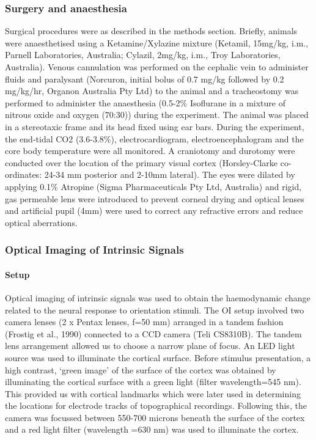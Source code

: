 		\subsubsection{Surgery and anaesthesia}
		Surgical procedures were as described in the methods section. Briefly, animals were anaesthetised using a Ketamine/Xylazine mixture (Ketamil, 15mg/kg, i.m., Parnell Laboratories, Australia; Cylazil, 2mg/kg, i.m., Troy Laboratories, Australia). Venous cannulation was performed on the cephalic vein to administer fluids and paralysant (Norcuron, initial bolus of 0.7 mg/kg followed by 0.2 mg/kg/hr, Organon Australia Pty Ltd) to the animal and a tracheostomy was performed to administer the anaesthesia (0.5-2\% Isoflurane in a mixture of nitrous oxide and oxygen (70:30)) during the experiment. The animal was placed in a stereotaxic frame and its head fixed using ear bars. During the experiment, the end-tidal CO2 (3.6-3.8\%), electrocardiogram, electroencephalogram and the core body temperature were all monitored. A craniotomy and durotomy were conducted over the location of the primary visual cortex (Horsley-Clarke co-ordinates: 24-34 mm posterior and 2-10mm lateral). The eyes were dilated by applying 0.1\% Atropine (Sigma Pharmaceuticals Pty Ltd, Australia) and rigid, gas permeable lens were introduced to prevent corneal drying and optical lenses and artificial pupil (4mm) were used to correct any refractive errors and reduce optical aberrations.
	
		\subsubsection{Optical Imaging of Intrinsic Signals}
		
		\paragraph{Setup}
		Optical imaging of intrinsic signals was used to obtain the haemodynamic change related to the neural response to orientation stimuli. The OI setup involved two camera lenses (2 x Pentax lenses, f=50 mm) arranged in a tandem fashion (Frostig et al., 1990) connected to a CCD camera (Teli CS8310B). The tandem lens arrangement allowed us to choose a narrow plane of focus. An LED light source was used to illuminate the cortical surface. Before stimulus presentation, a high contrast, ‘green image’ of the surface of the cortex was obtained by illuminating the cortical surface with a green light (filter wavelength=545 nm). This provided us with cortical landmarks which were later used in determining the locations for electrode tracks of topographical recordings. Following this, the camera was focussed between 550-700 microns beneath the surface of the cortex and a red light filter (wavelength =630 nm) was used to illuminate the cortex. 
		
